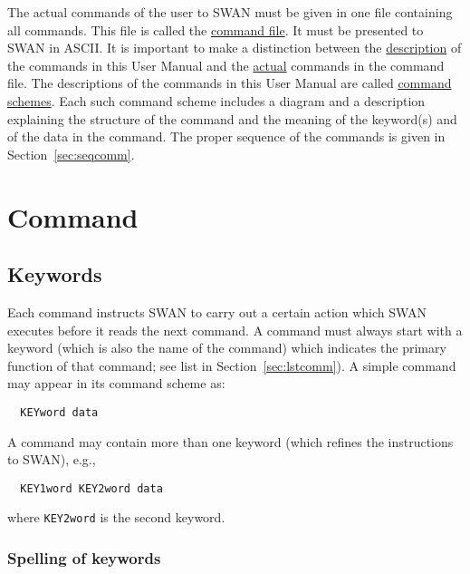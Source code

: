 \documentclass[12pt]{book}
\begin{document}
The actual commands of the user to SWAN must be given in one file containing all commands. This file is called the
\underline{command file}. It must be presented to SWAN in ASCII. It is important to make a distinction between the
\underline{description} of the commands in this User Manual and the \underline{actual} commands in the command file.
The descriptions of the commands in this User Manual are called \underline{command schemes}. Each such command scheme
includes a diagram and a description explaining the structure of the command and the meaning of the keyword(s) and
of the data in the command.  The proper sequence of the commands is given in Section~\ref{sec:seqcomm}.

\section{Command}

\subsection{Keywords}

Each command instructs SWAN to carry out a certain action which SWAN executes before it reads the next command.
A command must always start with a keyword (which is also the name of the command) which indicates the primary
function of that command; see list in Section~\ref{sec:lstcomm}). A simple command may appear in its command
scheme as:
\begin{verbatim}
  KEYword data
\end{verbatim}
A command may contain more than one keyword (which refines the instructions to SWAN), e.g.,
\begin{verbatim}
  KEY1word KEY2word data
\end{verbatim}
where {\tt KEY2word} is the second keyword.

\subsubsection{Spelling of keywords}
\end{document}
